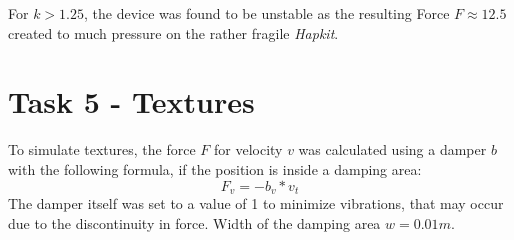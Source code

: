   \begin{figure}[H]
    \centering
  \end{figure}

  For $k > 1.25$, the device was found to be unstable as the resulting Force $F \approx 12.5$ created to much pressure on the rather fragile \textit{Hapkit}.

  \section*{Task 5 - Textures}

  To simulate textures, the force $F$ for velocity $v$ was calculated using a damper $b$ with the following formula, if the position is inside a damping area:
  \begin{equation*}
    F_{v} = -b_{v} * v_{t}
  \end{equation*}
  The damper itself was set to a value of 1 to minimize vibrations, that may occur due to the discontinuity in force. Width of the damping area $w = 0.01m$.

  \begin{figure}[H]
    \centering
  \end{figure}

